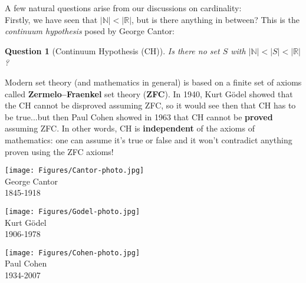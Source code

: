 \documentclass[a4paper,12pt,dvipsnames]{book}
\newtheorem{question}[theorem]{Question}
\numberwithin{theorem}{chapter}
\theoremstyle{remark}
\def\R{\mathbb{R}}
\def\N{{\mathbb{N}}}
\begin{document}
A few natural questions arise from our discussions on cardinality:\\

Firstly, we have seen that $|\N|<|\R|$, but is there anything in between? This is the {\it continuum hypothesis} posed by George Cantor:

\begin{question}[Continuum Hypothesis (CH)] Is there no set $S$ with $|\mathbb{N}|<|S|<|\mathbb{R}|$?
\end{question}


Modern set theory (and mathematics in general) is based on a finite set of axioms called {\bf Zermelo--Fraenkel} set theory ({\bf ZFC}). In 1940, Kurt G\"odel showed that the CH cannot be disproved assuming ZFC, so it would see then that CH has to be true...but then Paul Cohen showed in 1963 that CH cannot be {\bf proved} assuming ZFC. In other words, CH is {\bf independent} of the axioms of mathematics: one can assume it's true or false and it won't contradict anything proven using the ZFC axioms!



%



\begin{multicols}{3} 


\begin{center}
\texttt{[image: Figures/Cantor-photo.jpg]}\\
George Cantor\\
1845-1918
\end{center}

\begin{center}
\texttt{[image: Figures/Godel-photo.jpg]}\\
Kurt G\"odel\\
1906-1978\\
\end{center}

\begin{center}
\texttt{[image: Figures/Cohen-photo.jpg]}\\
Paul Cohen\\
1934-2007
\end{center}
\end{multicols}
\end{document}
